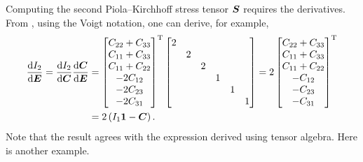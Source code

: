 Computing the second Piola--Kirchhoff stress tensor $\bm{S}$ requires the derivatives.
From , using the Voigt notation, one can derive, for example,
\begin{gather}
\begin{split}
    \dfrac{\mathrm{d}I_2}{\mathrm{d}\bm{E}}=\dfrac{\mathrm{d}I_2}{\mathrm{d}\bm{C}}\dfrac{\mathrm{d}\bm{C}}{\mathrm{d}\bm{E}}&=\begin{bmatrix}
        C_{22}+C_{33} \\
        C_{11}+C_{33} \\
        C_{11}+C_{22} \\
        -2C_{12}      \\
        -2C_{23}      \\
        -2C_{31}
    \end{bmatrix}^{\mathrm{T}}\begin{bmatrix}
        2 &   &   &   &   &   \\
          & 2 &   &   &   &   \\
          &   & 2 &   &   &   \\
          &   &   & 1 &   &   \\
          &   &   &   & 1 &   \\
          &   &   &   &   & 1
    \end{bmatrix}=2\begin{bmatrix}
        C_{22}+C_{33} \\
        C_{11}+C_{33} \\
        C_{11}+C_{22} \\
        -C_{12}       \\
        -C_{23}       \\
        -C_{31}
    \end{bmatrix}^{\mathrm{T}}\\&=2\left(I_1\bm{1}-\bm{C}\right).
\end{split}
\end{gather}
Note that the result agrees with the expression derived using tensor algebra.
Here is another example.
